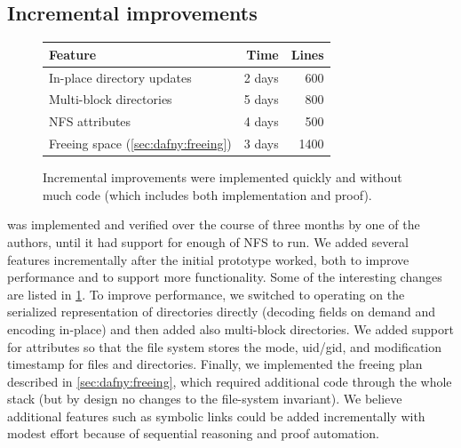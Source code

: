
\subsection{Incremental improvements}
\label{sec:eval:incremental}

\begin{figure}
\small
\begin{center}
\begin{tabular}{lrr}
  \toprule
  \textbf{Feature} & \textbf{Time} & \textbf{Lines} \\
  \midrule
  In-place directory updates & 2 days & 600\\
  Multi-block directories & 5 days & 800 \\
  NFS attributes & 4 days & 500 \\
  Freeing space (\cref{sec:dafny:freeing}) & 3 days & 1400\\
  \bottomrule
\end{tabular}
\end{center}
\caption{Incremental improvements were implemented quickly and without much
  code (which includes both implementation and proof).}
\label{fig:features}
\end{figure}

\sys was implemented and verified over the course of three months by
one of the authors, until it had support for enough of NFS to run. We
added several features incrementally after the initial prototype
worked, both to improve performance and to support more
functionality. Some of the interesting changes are listed in
\cref{fig:features}.  To improve performance, we switched to
operating on the serialized representation of directories directly
(decoding fields on demand and encoding in-place) and then added also
multi-block directories.  We added support for attributes so that the file
system stores the mode, uid/gid, and modification timestamp for files and directories.
Finally, we implemented the freeing plan described
in \cref{sec:dafny:freeing}, which required additional code through the
whole stack (but by design no changes to the file-system invariant).
We believe additional features such as symbolic links
could be added incrementally with modest effort because
of sequential reasoning and proof automation.

